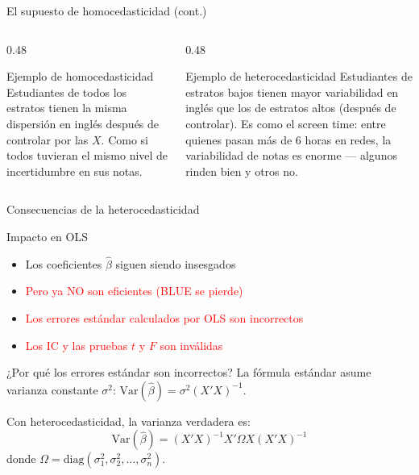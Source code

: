 \documentclass[aspectratio=169, 11pt]{beamer}
\begin{document}
\begin{frame}{El supuesto de homocedasticidad (cont.)}
\begin{columns}
\begin{column}{0.48\textwidth}
\begin{exampleblock}{Ejemplo de homocedasticidad}
Estudiantes de todos los estratos tienen la misma dispersi\'on en ingl\'es despu\'es de controlar por las $X$. Como si todos tuvieran el mismo nivel de incertidumbre en sus notas.
\end{exampleblock}
\end{column}

\begin{column}{0.48\textwidth}
\begin{alertblock}{Ejemplo de heterocedasticidad}
Estudiantes de estratos bajos tienen mayor variabilidad en ingl\'es que los de estratos altos (despu\'es de controlar). Es como el screen time: entre quienes pasan m\'as de 6 horas en redes, la variabilidad de notas es enorme --- algunos rinden bien y otros no.
\end{alertblock}
\end{column}
\end{columns}
\end{frame}

\begin{frame}{Consecuencias de la heterocedasticidad}
\begin{alertblock}{Impacto en OLS}
\begin{itemize}
\item \textcolor{javerianalight}{Los coeficientes $\hat{\beta}$ siguen siendo insesgados}
\item \textcolor{red}{Pero ya NO son eficientes (BLUE se pierde)}
\item \textcolor{red}{Los errores estándar calculados por OLS son incorrectos}
\item \textcolor{red}{Los IC y las pruebas $t$ y $F$ son inválidas}
\end{itemize}
\end{alertblock}

\vspace{0.15cm}
\begin{block}{¿Por qué los errores estándar son incorrectos?}
La fórmula estándar asume varianza constante $\sigma^2$: $\text{Var}(\hat{\beta}) = \sigma^2 (X'X)^{-1}$.

Con heterocedasticidad, la varianza verdadera es:
$$\text{Var}(\hat{\beta}) = (X'X)^{-1} X' \Omega X (X'X)^{-1}$$
donde $\Omega = \text{diag}(\sigma_1^2, \sigma_2^2, \ldots, \sigma_n^2)$.
\end{block}
\end{frame}
\end{document}
